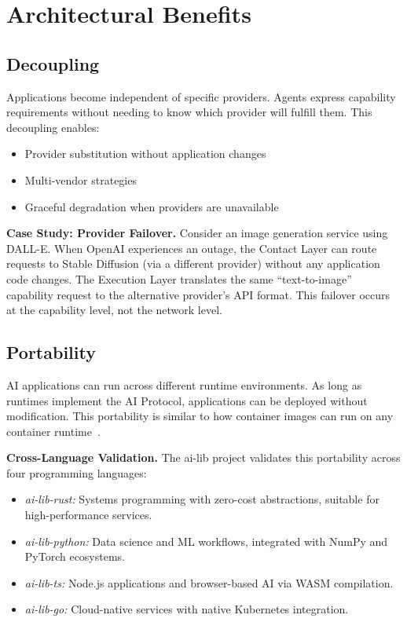 \section{Architectural Benefits}

\subsection{Decoupling}

Applications become independent of specific providers. Agents express capability requirements without needing to know which provider will fulfill them. This decoupling enables:
\begin{itemize}
    \item Provider substitution without application changes
    \item Multi-vendor strategies
    \item Graceful degradation when providers are unavailable
\end{itemize}

\textbf{Case Study: Provider Failover.} Consider an image generation service using DALL-E. When OpenAI experiences an outage, the Contact Layer can route requests to Stable Diffusion (via a different provider) without any application code changes. The Execution Layer translates the same ``text-to-image'' capability request to the alternative provider's API format. This failover occurs at the capability level, not the network level.

\subsection{Portability}

AI applications can run across different runtime environments. As long as runtimes implement the AI Protocol, applications can be deployed without modification. This portability is similar to how container images can run on any container runtime~\cite{kubernetes2024,borg2016}.

\textbf{Cross-Language Validation.} The ai-lib project validates this portability across four programming languages:
\begin{itemize}
    \item \emph{ai-lib-rust:} Systems programming with zero-cost abstractions, suitable for high-performance services.
    \item \emph{ai-lib-python:} Data science and ML workflows, integrated with NumPy and PyTorch ecosystems.
    \item \emph{ai-lib-ts:} Node.js applications and browser-based AI via WASM compilation.
    \item \emph{ai-lib-go:} Cloud-native services with native Kubernetes integration.
\end{itemize}

